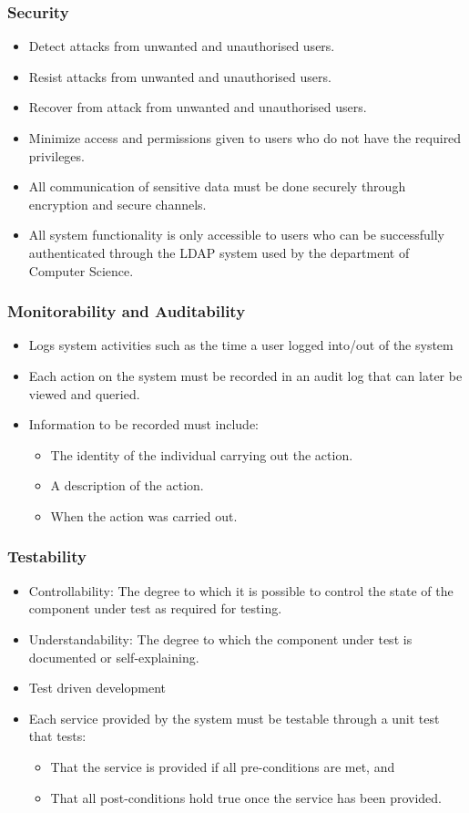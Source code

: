 \documentclass[12pt, oneside]{article}
\begin{document}
		\subsubsection{Security}
			\begin{itemize}
				\item Detect attacks from unwanted and unauthorised users.
				\item Resist attacks from unwanted and unauthorised users.
				\item Recover from attack from unwanted and unauthorised users.
				\item Minimize access and permissions given to users who do not have the required privileges.
				\item All communication of sensitive data must be done securely through encryption and secure channels.
				\item All system functionality is only accessible to users who can be successfully authenticated through the LDAP system used by the department of Computer Science.
			\end{itemize}
		\subsubsection{Monitorability and Auditability}
			\begin{itemize}
				\item Logs system activities such as the time a user logged into/out of the system
				\item Each action on the system must be recorded in an audit log that can later be viewed and queried.
				\item Information to be recorded must include:
				\begin{itemize}
					\item The identity of the individual carrying out the action.
					\item A description of the action.
					\item When the action was carried out.
				\end{itemize}
			\end{itemize}
		\subsubsection{Testability}
			\begin{itemize}
				\item Controllability: The degree to which it is possible to control the state of the component under test as required for testing.
				\item Understandability: The degree to which the component under test is documented or self-explaining.
				\item Test driven development
				\item Each service provided by the system must be testable through a unit test that tests:
				\begin{itemize}
					\item That the service is provided if all pre-conditions are met, and
					\item That all post-conditions hold true once the service has been provided.
				\end{itemize}
			\end{itemize}
\end{document}
